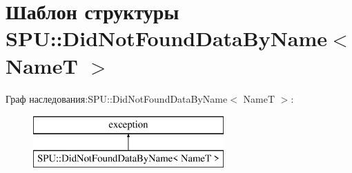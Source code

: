 \hypertarget{struct_s_p_u_1_1_did_not_found_data_by_name}{}\section{Шаблон структуры S\+PU\+:\+:Did\+Not\+Found\+Data\+By\+Name$<$ NameT $>$}
\label{struct_s_p_u_1_1_did_not_found_data_by_name}
Граф наследования\+:S\+PU\+:\+:Did\+Not\+Found\+Data\+By\+Name$<$ NameT $>$\+:\begin{figure}[H]
\begin{center}
\leavevmode
\includegraphics[height=2.000000cm]{struct_s_p_u_1_1_did_not_found_data_by_name}
\end{center}
\end{figure}

